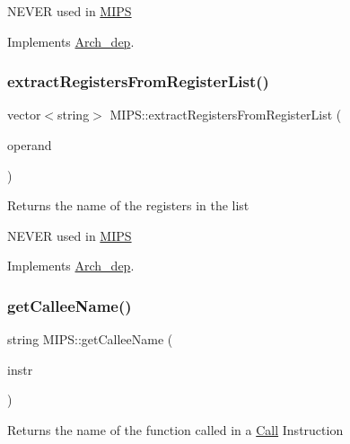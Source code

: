 N\+E\+V\+ER used in \hyperlink{classMIPS}{M\+I\+PS} 

Implements \hyperlink{classArch__dep_a58002697a2ce55ff09eee606807cfab3}{Arch\+\_\+dep}.

\mbox{\label{classMIPS_a6eecdd7a94436748b1bc224cf78ac075}} 
\subsubsection{\texorpdfstring{extract\+Registers\+From\+Register\+List()}{extractRegistersFromRegisterList()}}
{\footnotesize\ttfamily vector$<$string$>$ M\+I\+P\+S\+::extract\+Registers\+From\+Register\+List (\begin{DoxyParamCaption}\item[{const string \&}]{operand }\end{DoxyParamCaption})\hspace{0.3cm}{\ttfamily [virtual]}}

Returns the name of the registers in the list

N\+E\+V\+ER used in \hyperlink{classMIPS}{M\+I\+PS} 

Implements \hyperlink{classArch__dep_afac73b40e179fbab3fc0954aa060548f}{Arch\+\_\+dep}.

\mbox{\label{classMIPS_adc2a687a1c64a5240d7d1ce7e294fdfc}} 
\subsubsection{\texorpdfstring{get\+Callee\+Name()}{getCalleeName()}}
{\footnotesize\ttfamily string M\+I\+P\+S\+::get\+Callee\+Name (\begin{DoxyParamCaption}\item[{const \hyperlink{classObjdumpInstruction}{Objdump\+Instruction} \&}]{instr }\end{DoxyParamCaption})\hspace{0.3cm}{\ttfamily [virtual]}}

Returns the name of the function called in a \hyperlink{classCall}{Call} Instruction 

